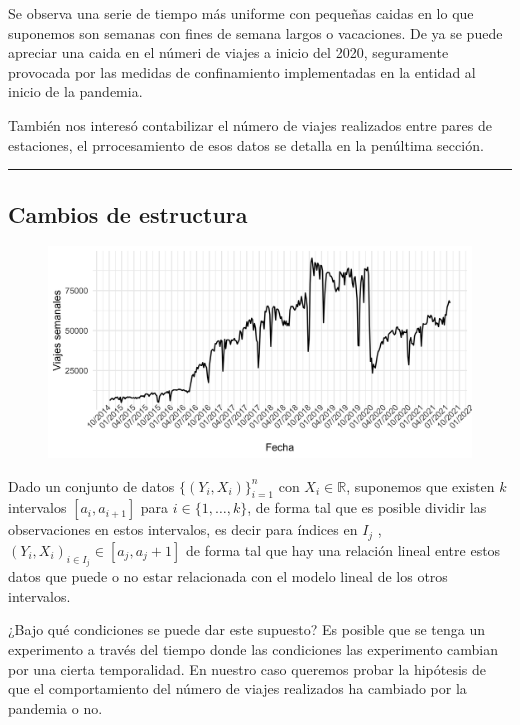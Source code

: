 \documentclass[
]{article}
\begin{document}
Se observa una serie de tiempo más uniforme con pequeñas caidas en lo
que suponemos son semanas con fines de semana largos o vacaciones. De ya
se puede apreciar una caida en el númeri de viajes a inicio del 2020,
seguramente provocada por las medidas de confinamiento implementadas en
la entidad al inicio de la pandemia.

También nos interesó contabilizar el número de viajes realizados entre
pares de estaciones, el prrocesamiento de esos datos se detalla en la
penúltima sección.

\begin{center}\rule{0.5\linewidth}{0.5pt}\end{center}
\newpage
\hypertarget{cambios-de-estructura}{%
\subsection{Cambios de estructura}\label{cambios-de-estructura}}

\begin{figure}[!h]
\centering
\includegraphics[width=12cm]{../plots/serie1.png}
\end{figure}

Dado un conjunto de datos \(\{(Y_i, X_i)\}_{i=1}^n\) con \(X_i \in \mathbb{R}\),
suponemos que existen \(k\) intervalos \([a_i, a_{i+1}]\) para
\(i \in \{1, \dots, k\}\), de forma tal que es posible dividir las
observaciones en estos intervalos, es decir para índices en \(I_j\) ,
\((Y_i, X_i)_{i \in I_j} \in [a_j, a_j+1]\) de forma tal que hay una
relación lineal entre estos datos que puede o no estar relacionada con
el modelo lineal de los otros intervalos.

¿Bajo qué condiciones se puede dar este supuesto? Es posible que se
tenga un experimento a través del tiempo donde las condiciones las
experimento cambian por una cierta temporalidad. En nuestro caso
queremos probar la hipótesis de que el comportamiento del número de
viajes realizados ha cambiado por la pandemia o no.
\end{document}
